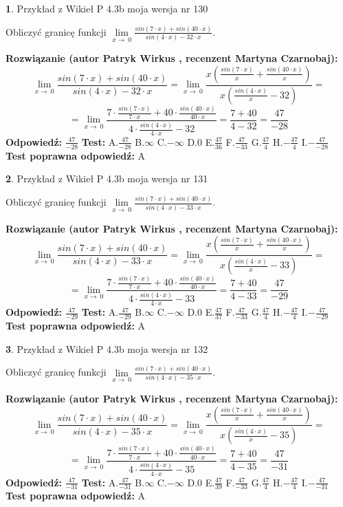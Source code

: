 \documentclass[12pt, a4paper]{article}
\theoremstyle{definition} %
\newtheorem{zad}{}
\newcommand{\zadStart}[1]{\begin{zad}#1\newline}
\newcommand{\zadStop}{\end{zad}}
\newcommand{\rozwStart}[2]{\noindent \textbf{Rozwiązanie (autor #1 , recenzent #2): }\newline}
\newcommand{\rozwStop}{\newline}
\newcommand{\odpStart}{\noindent \textbf{Odpowiedź:}\newline}
\newcommand{\odpStop}{\newline}
\newcommand{\testStart}{\noindent \textbf{Test:}\newline}
\newcommand{\testStop}{\newline}
\newcommand{\kluczStart}{\noindent \textbf{Test poprawna odpowiedź:}\newline}
\newcommand{\kluczStop}{\newline}
\begin{document}
\zadStart{Przykład z Wikieł P 4.3b moja wersja nr 130}


Obliczyć granicę funkcji $\lim\limits_{x\to\ 0}\frac{sin(7 \cdot x)+sin(40 \cdot x)}{sin(4 \cdot x)-32 \cdot x}$.
\zadStop
\rozwStart{Patryk Wirkus}{Martyna Czarnobaj}
$$\lim\limits_{x\to\ 0}\frac{sin(7 \cdot x)+sin(40 \cdot x)}{sin(4 \cdot x)-32 \cdot x}=\lim\limits_{x\to\ 0}\frac{x(\frac{sin(7 \cdot x)}{x}+\frac{sin(40 \cdot x)}{x})}{x(\frac{sin(4 \cdot x)}{x}-32)}=$$
$$=\lim\limits_{x\to\ 0}\frac{7 \cdot \frac{sin(7 \cdot x)}{7 \cdot x}+40 \cdot \frac{sin(40 \cdot x)}{40 \cdot x}}{4 \cdot \frac{sin(4 \cdot x)}{4 \cdot x}-32}=\frac{7+40}{4-32} = \frac{47}{-28}$$
\rozwStop
\odpStart
$\frac{47}{-28}$
\odpStop
\testStart
A.$\frac{47}{-28}$
B.$\infty$
C.$-\infty$
D.$0$
E.$\frac{47}{36}$
F.$\frac{47}{-33}$
G.$\frac{47}{4}$
H.$-\frac{47}{4}$
I.$-\frac{47}{-28}$
\testStop
\kluczStart
A
\kluczStop



\zadStart{Przykład z Wikieł P 4.3b moja wersja nr 131}


Obliczyć granicę funkcji $\lim\limits_{x\to\ 0}\frac{sin(7 \cdot x)+sin(40 \cdot x)}{sin(4 \cdot x)-33 \cdot x}$.
\zadStop
\rozwStart{Patryk Wirkus}{Martyna Czarnobaj}
$$\lim\limits_{x\to\ 0}\frac{sin(7 \cdot x)+sin(40 \cdot x)}{sin(4 \cdot x)-33 \cdot x}=\lim\limits_{x\to\ 0}\frac{x(\frac{sin(7 \cdot x)}{x}+\frac{sin(40 \cdot x)}{x})}{x(\frac{sin(4 \cdot x)}{x}-33)}=$$
$$=\lim\limits_{x\to\ 0}\frac{7 \cdot \frac{sin(7 \cdot x)}{7 \cdot x}+40 \cdot \frac{sin(40 \cdot x)}{40 \cdot x}}{4 \cdot \frac{sin(4 \cdot x)}{4 \cdot x}-33}=\frac{7+40}{4-33} = \frac{47}{-29}$$
\rozwStop
\odpStart
$\frac{47}{-29}$
\odpStop
\testStart
A.$\frac{47}{-29}$
B.$\infty$
C.$-\infty$
D.$0$
E.$\frac{47}{37}$
F.$\frac{47}{-33}$
G.$\frac{47}{4}$
H.$-\frac{47}{4}$
I.$-\frac{47}{-29}$
\testStop
\kluczStart
A
\kluczStop



\zadStart{Przykład z Wikieł P 4.3b moja wersja nr 132}


Obliczyć granicę funkcji $\lim\limits_{x\to\ 0}\frac{sin(7 \cdot x)+sin(40 \cdot x)}{sin(4 \cdot x)-35 \cdot x}$.
\zadStop
\rozwStart{Patryk Wirkus}{Martyna Czarnobaj}
$$\lim\limits_{x\to\ 0}\frac{sin(7 \cdot x)+sin(40 \cdot x)}{sin(4 \cdot x)-35 \cdot x}=\lim\limits_{x\to\ 0}\frac{x(\frac{sin(7 \cdot x)}{x}+\frac{sin(40 \cdot x)}{x})}{x(\frac{sin(4 \cdot x)}{x}-35)}=$$
$$=\lim\limits_{x\to\ 0}\frac{7 \cdot \frac{sin(7 \cdot x)}{7 \cdot x}+40 \cdot \frac{sin(40 \cdot x)}{40 \cdot x}}{4 \cdot \frac{sin(4 \cdot x)}{4 \cdot x}-35}=\frac{7+40}{4-35} = \frac{47}{-31}$$
\rozwStop
\odpStart
$\frac{47}{-31}$
\odpStop
\testStart
A.$\frac{47}{-31}$
B.$\infty$
C.$-\infty$
D.$0$
E.$\frac{47}{39}$
F.$\frac{47}{-33}$
G.$\frac{47}{4}$
H.$-\frac{47}{4}$
I.$-\frac{47}{-31}$
\testStop
\kluczStart
A
\kluczStop
\end{document}
